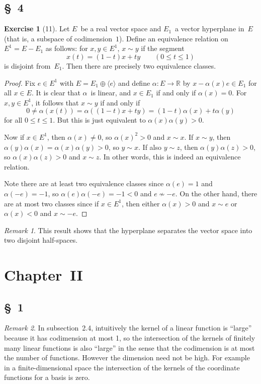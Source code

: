 \documentclass[letterpaper,12pt]{article}
\newcommand{\R}{\mathbb{R}}
\renewcommand{\equiv}{\sim}
\newcommand{\dsum}{\oplus}
\newcommand{\gen}[1]{\langle#1\rangle}
\theoremstyle{definition}
\newtheorem*{exer}{Exercise}
\theoremstyle{remark}
\newtheorem*{rmk}{Remark}
\begin{document}
\subsection*{\S~4}
\begin{exer}[11]
Let \(E\)~be a real vector space and \(E_1\)~a vector hyperplane in~\(E\) (that is, a subspace of codimension~\(1\)). Define an equivalence relation on \(E^1=E-E_1\) as follows: for \(x,y\in E^1\), \(x\equiv y\) if the segment
\[x(t)=(1-t)x+ty\qquad(0\le t\le 1)\]
is disjoint from~\(E_1\). Then there are precisely two equivalence classes.
\end{exer}
\begin{proof}
Fix \(e\in E^1\) with \(E=E_1\dsum\gen{e}\) and define \(\alpha:E\to\R\) by \(x-\alpha(x)e\in E_1\) for all \(x\in E\). It is clear that \(\alpha\)~is linear, and \(x\in E_1\) if and only if \(\alpha(x)=0\). For \(x,y\in E^1\), it follows that \(x\equiv y\) if and only if
\[0\ne\alpha(x(t))=\alpha((1-t)x+ty)=(1-t)\alpha(x)+t\alpha(y)\]
for all \(0\le t\le 1\). But this is just equivalent to \(\alpha(x)\alpha(y)>0\).

Now if \(x\in E^1\), then \(\alpha(x)\ne0\), so \(\alpha(x)^2>0\) and \(x\equiv x\). If \(x\equiv y\), then \(\alpha(y)\alpha(x)=\alpha(x)\alpha(y)>0\), so \(y\equiv x\). If also \(y\equiv z\), then \(\alpha(y)\alpha(z)>0\), so \(\alpha(x)\alpha(z)>0\) and \(x\equiv z\). In other words, this is indeed an equivalence relation.

Note there are at least two equivalence classes since \(\alpha(e)=1\) and \(\alpha(-e)=-1\), so \(\alpha(e)\alpha(-e)=-1<0\) and \(e\not\equiv -e\). On the other hand, there are at most two classes since if \(x\in E^1\), then either \(\alpha(x)>0\) and \(x\equiv e\) or \(\alpha(x)<0\) and \(x\equiv -e\).
\end{proof}
\begin{rmk}
This result shows that the hyperplane separates the vector space into two disjoint half-spaces.
\end{rmk}

\section*{Chapter~II}
\subsection*{\S~1}
\begin{rmk}
In subsection~2.4, intuitively the kernel of a linear function is ``large'' because it has codimension at most 1, so the intersection of the kernels of finitely many linear functions is also ``large'' in the sense that the codimension is at most the number of functions. However the dimension need not be high. For example in a finite-dimensional space the intersection of the kernels of the coordinate functions for a basis is zero.
\end{rmk}
\end{document}
